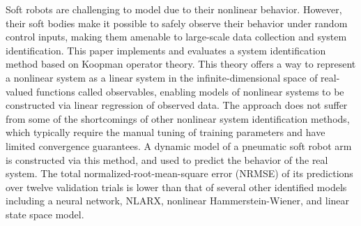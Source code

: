 Soft robots are challenging to model due to their nonlinear behavior.
However, their soft bodies make it possible to safely observe their behavior under random control inputs, making them amenable to large-scale data collection and system identification.
This paper implements and evaluates a system identification method based on Koopman operator theory.
This theory offers a way to represent a nonlinear system as a linear system in the infinite-dimensional space of real-valued functions called observables, enabling models of nonlinear systems to be constructed via linear regression of observed data.
The approach does not suffer from some of the shortcomings of other nonlinear system identification methods, which typically require the manual tuning of training parameters and have limited convergence guarantees.
A dynamic model of a pneumatic soft robot arm is constructed via this method, and used to predict the behavior of the real system.
The total normalized-root-mean-square error (NRMSE) of its predictions over twelve validation trials is lower than
that of several other identified models including a neural network, NLARX, nonlinear Hammerstein-Wiener, and linear state space model.











